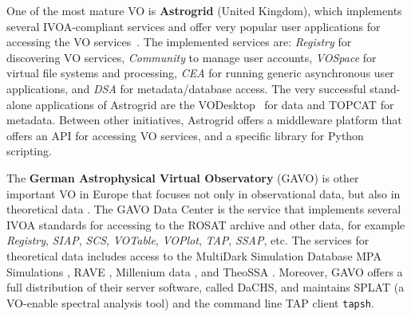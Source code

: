 One of the most mature VO is \textbf{Astrogrid} (United Kingdom), which implements
several IVOA-compliant services and offer very popular user applications
for accessing the VO services~\cite{}.
The implemented services are: \emph{Registry}
for discovering VO services, \emph{Community} to manage user accounts, 
\emph{VOSpace} for virtual file systems and processing, \emph{CEA} for running
generic asynchronous user applications, and \emph{DSA} for metadata/database
access. The very successful stand-alone applications of Astrogrid are 
the VODesktop~\cite{} for data and
TOPCAT \cite{} for metadata.
Between other initiatives, Astrogrid offers a middleware platform 
that offers an API for accessing VO services, and a specific 
library for Python scripting.

The \textbf{German Astrophysical Virtual Observatory} (GAVO) is other important VO in Europe that focuses not
only in observational data, but also in theoretical data \cite{}.
The GAVO Data Center is the service that implements several IVOA standards for 
accessing to the ROSAT archive and other data, for example 
\emph{Registry}, \emph{SIAP}, \emph{SCS}, \emph{VOTable}, \emph{VOPlot}, 
\emph{TAP}, \emph{SSAP}, etc. The services for 
theoretical data includes access to the MultiDark Simulation Database \cite{}
MPA Simulations \cite{},
RAVE \cite{},
Millenium data \cite{},
and TheoSSA \cite{}.
Moreover, GAVO offers a full distribution of their server software, called
DaCHS, and maintains SPLAT (a VO-enable spectral analysis tool) and the command line TAP
client \texttt{tapsh}.


%
%
%


